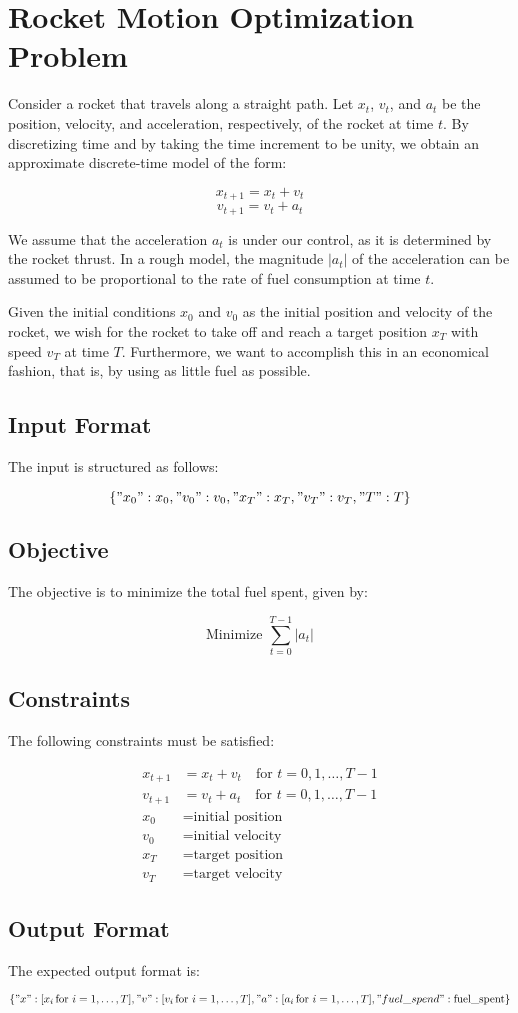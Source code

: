 \documentclass{article}
\begin{document}
\section*{Rocket Motion Optimization Problem}

Consider a rocket that travels along a straight path. Let \( x_t \), \( v_t \), and \( a_t \) be the position, velocity, and acceleration, respectively, of the rocket at time \( t \). By discretizing time and by taking the time increment to be unity, we obtain an approximate discrete-time model of the form:

\[
x_{t+1} = x_t + v_t
\]
\[
v_{t+1} = v_t + a_t
\]

We assume that the acceleration \( a_t \) is under our control, as it is determined by the rocket thrust. In a rough model, the magnitude \( |a_t| \) of the acceleration can be assumed to be proportional to the rate of fuel consumption at time \( t \). 

Given the initial conditions \( x_0 \) and \( v_0 \) as the initial position and velocity of the rocket, we wish for the rocket to take off and reach a target position \( x_T \) with speed \( v_T \) at time \( T \). Furthermore, we want to accomplish this in an economical fashion, that is, by using as little fuel as possible.

\subsection*{Input Format}

The input is structured as follows:

\[
\{ 
    "x_0": x_0, 
    "v_0": v_0, 
    "x_T": x_T, 
    "v_T": v_T, 
    "T": T 
\}
\]

\subsection*{Objective}

The objective is to minimize the total fuel spent, given by:

\[
\text{Minimize } \sum_{t=0}^{T-1} |a_t|
\]

\subsection*{Constraints}

The following constraints must be satisfied:

\[
\begin{align*}
x_{t+1} &= x_t + v_t \quad \text{for } t = 0, 1, \ldots, T-1 \\
v_{t+1} &= v_t + a_t \quad \text{for } t = 0, 1, \ldots, T-1 \\
x_0 &= \text{initial position} \\
v_0 &= \text{initial velocity} \\
x_T &= \text{target position} \\
v_T &= \text{target velocity}
\end{align*}
\]

\subsection*{Output Format}

The expected output format is:

\[
\{ 
    "x": [x_i \, \text{for } i = 1, \ldots, T], 
    "v": [v_i \, \text{for } i = 1, \ldots, T], 
    "a": [a_i \, \text{for } i = 1, \ldots, T], 
    "fuel\_spend": \text{fuel\_spent} 
\}
\]
\end{document}

